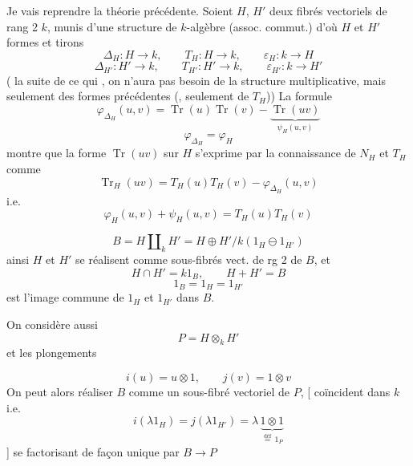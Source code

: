 \documentclass[11pt,a4paper]{article}
\begin{document}
Je vais reprendre la théorie précédente. Soient $H$, $H'$ deux fibrés vectoriels de rang 2  $k$, munis d'une  structure de $k$-algèbre (assoc. commut.) d'où  $H$ et $H'$ formes \emph{} et tirons
\[ \Delta_H : H\to k , \qquad T_H : H\to k , \qquad \varepsilon_H : k\to H \]
\[ \Delta_{H'} : H'\to k , \qquad T_{H'} : H'\to k , \qquad \varepsilon_{H'} : k\to H' \]
( la suite de ce qui , on n'aura pas besoin de la structure multiplicative, mais seulement des formes précédentes (, seulement de $T_H$)) La formule
\[ \varphi_{\Delta_H}(u,v) = \operatorname{Tr}(u)\operatorname{Tr}(v) - \underbrace{\operatorname{Tr}(uv)}_{\psi_H(u,v)} \]
\[ \varphi_{\Delta_H} = \varphi_H \]
montre que la forme $\operatorname{Tr}(uv)$ sur $H$ s'exprime par la connaissance de $N_H$ et $T_H$ comme
\[ \operatorname{Tr}_H(uv) = T_H(u)T_H(v) - \varphi_{\Delta_H}(u,v) \]
i.e.
\[ \varphi_H(u,v) + \psi_H(u,v) = T_H(u)T_H(v) \]

\[ B = H \amalg_k H' = H\oplus H' / k(1_H \ominus 1_{H'}) \]
ainsi $H$ et $H'$ se réalisent comme sous-fibrés vect. de rg 2 de $B$, et
\[ H\cap H' = k1_B , \qquad H+H' = B \]
\[ 1_B = 1_H = 1_{H'} \]
est l'image commune de $1_H$ et $1_{H'}$ dans $B$.

On considère aussi
\[ P = H\otimes_k H' \]
et les plongements


\[ i(u) = u\otimes 1 , \qquad j(v) = 1\otimes v \]
On peut alors réaliser $B$ comme un sous-fibré vectoriel de $P$, \struck{\ill{}} [ \og coïncident dans $k$\fg{} i.e.
\[ i(\lambda 1_H) = j(\lambda 1_{H'}) = \lambda\, \underbrace{1\otimes 1}_{\overset{\text{déf}}{=}\,1_P} \]
] se factorisant de façon unique par $B\to P$
\end{document}
